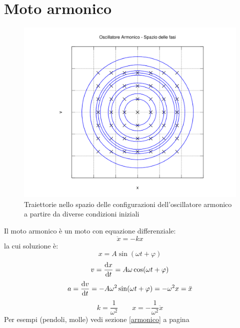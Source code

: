 \section{Moto armonico}
\begin{figure}[htbp]
 \centering
 \includegraphics[scale=0.6]{immagini/fisica1/oscillatore_fase}
 \caption{Traiettorie nello spazio delle configurazioni dell'oscillatore armonico a partire da diverse condizioni iniziali}
\end{figure}
Il moto armonico è un moto con equazione differenziale:
\begin{equation*}\ddot x=-k x\end{equation*}
la cui soluzione è:
\begin{equation*}x=A\sin(\omega t+\varphi)\end{equation*}
\begin{equation*}v=\frac{\mathrm{d} x}{\mathrm{d} t}=A\omega\cos(\omega t+\varphi)\end{equation*}
\begin{equation*}a=\frac{\mathrm{d} v}{\mathrm{d} t}=-A\omega^2\sin(\omega t+\varphi)=-\omega^2 x=\ddot x\end{equation*}
\begin{equation*}k=\frac{1}{\omega^2}\qquad x=-\frac{1}{\omega^2}\ddot x\end{equation*}
 Per esempi (pendoli, molle) vedi sezione \ref{armonico} a
pagina \pageref{armonico}
